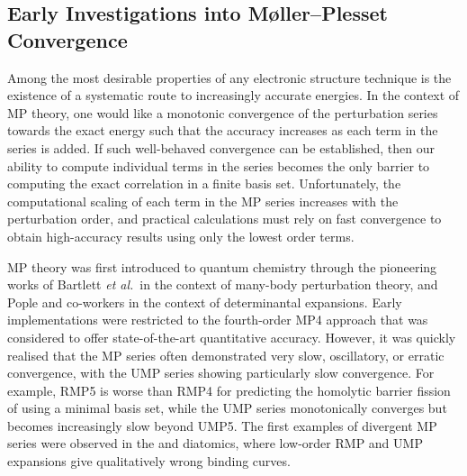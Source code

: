 \documentclass[aps,prb,reprint,noshowkeys,linenumbers,superscriptaddress]{revtex4-1}
\newcommand{\etal}{\textit{et al.}}
\begin{document}
\subsection{Early Investigations into M{\o}ller--Plesset Convergence} %

 Among the most desirable properties of any electronic structure technique is the existence of 
a systematic route to increasingly accurate energies. 
In the context of MP theory, one would like a monotonic convergence of the perturbation
series towards the exact energy such that the accuracy increases as each term in the series is added.
If such well-behaved convergence can be established, then our ability to compute individual 
terms in the series becomes the only barrier to computing the exact correlation in a finite basis set.
Unfortunately, the computational scaling of each term in the MP series increases with the perturbation
order, and practical calculations must rely on fast convergence
to obtain high-accuracy results using only the lowest order terms.

MP theory was first introduced to quantum chemistry through the pioneering
works of Bartlett \etal\ in the context of many-body perturbation theory,\cite{Bartlett_1975}
and Pople and co-workers in the context of determinantal expansions.\cite{Pople_1976,Pople_1978}
Early implementations were restricted to the fourth-order MP4 approach that was considered
to offer state-of-the-art quantitative accuracy.\cite{Pople_1978,Krishnan_1980}
However, it was quickly realised that the MP series often demonstrated very slow, oscillatory, 
or erratic convergence, with the UMP series showing particularly slow convergence.\cite{Laidig_1985,Knowles_1985,Handy_1985}
For example, RMP5 is worse than RMP4 for predicting the homolytic barrier fission of  using a minimal basis set, 
while the UMP series monotonically converges but becomes increasingly slow beyond UMP5.\cite{Gill_1986}
The first examples of divergent MP series were observed in the  and  
diatomics, where low-order RMP and UMP expansions give qualitatively wrong binding curves.\cite{Laidig_1987} 
\end{document}
